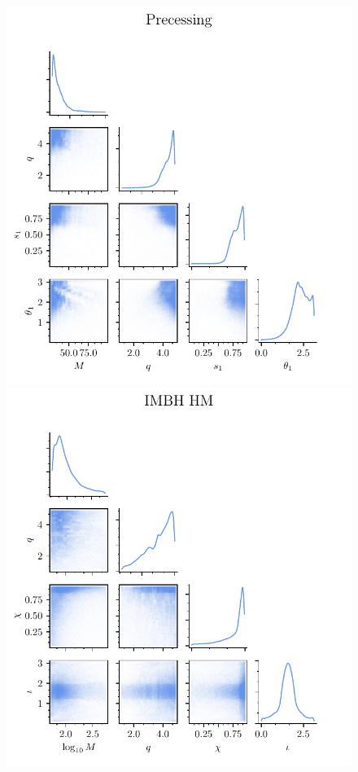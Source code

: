 \documentclass[twocolumn,showpacs,preprintnumbers,nofootinbib,prd,
superscriptaddress,10pt]{revtex4-1}
\begin{document}
\begin{figure}[t]
	\includegraphics{bank_scatter_Precessing}\hfill
	\includegraphics{bank_scatter_IMBH_HM}\hfill

\end{figure}
\end{document}
